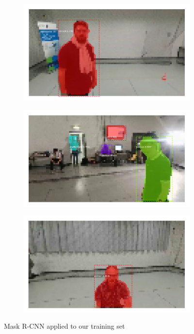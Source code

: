 \begin{figure}[!h]
\begin{center}
\begin{subfigure}[h]{0.32\textwidth}
		\end{subfigure}
		\begin{subfigure}[h]{0.32\textwidth}
			\centering
			\includegraphics[width=1\textwidth]{"contents/images/04-maskrcnn-train-7"}
		\end{subfigure}
		\begin{subfigure}[h]{0.32\textwidth}
			\centering
			\includegraphics[width=1\textwidth]{"contents/images/04-maskrcnn-train-8"}
		\end{subfigure}
		\begin{subfigure}[h]{0.32\textwidth}
			\centering
			\includegraphics[width=1\textwidth]{"contents/images/04-maskrcnn-train-9"}
		\end{subfigure}
	\end{center}
	\vspace{-0.5cm}
	\caption[Mask R-CNN applied to our training set]{Mask R-CNN applied to our training set}
	\label{fig:maskrcnn-dario}
\end{figure}

